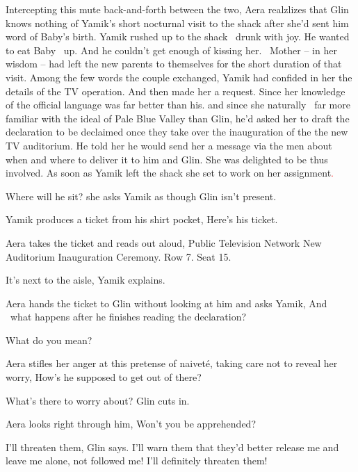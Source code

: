 \documentclass[letterpaper]{article}
\begin{document}
Intercepting this mute back-and-forth between the two, Aera realzlizes that Glin knows nothing of Yamik's short
nocturnal visit to the shack after she'd sent him word of Baby's birth. Yamik rushed up to the shack \ drunk with joy.
He wanted to eat Baby \ up. And he\textcolor{red}{ }couldn't get enough of kissing her. ~Mother -- in her wisdom -- had
left the new parents to themselves for the short duration of that visit. Among the few words the couple exchanged,
Yamik had confided in her the details of the TV operation. And then made her a request. Since her knowledge of the
official language was far better than his. and since she naturally \ far more familiar with the ideal of Pale Blue
Valley than Glin, he'd asked her to draft the declaration to be declaimed once they take over the inauguration of the
the new TV auditorium. He told her he would send her a message via the men about when and where to deliver it to him
and Glin. She was delighted to be thus involved. As soon as Yamik left the shack she set to work on her
assignment\textcolor{red}{. }

{\textquotedbl}Where will he sit?{\textquotedbl} she asks Yamik as though Glin isn't present. 

Yamik produces a ticket from his shirt pocket, {\textquotedbl}Here's his ticket.{\textquotedbl} 

Aera takes the ticket and reads out aloud, {\textquotedbl}Public Television Network New Auditorium Inauguration
Ceremony. Row 7. Seat 15.{\textquotedbl} 

{\textquotedbl}It's next to the aisle,{\textquotedbl} Yamik explains. 

Aera hands the ticket to Glin without looking at him and asks Yamik, {\textquotedbl}And \ what happens after he finishes
reading the declaration?{\textquotedbl} 

{\textquotedbl}What do you mean?{\textquotedbl} 

Aera stifles her anger at this pretense of naivet\'e, taking care not to reveal her worry, {\textquotedbl}How's he
supposed to get out of there?{\textquotedbl} 

{\textquotedbl}What's there to worry about?{\textquotedbl} Glin cuts in\textcolor[rgb]{0.0,0.4392157,0.7529412}{.}

Aera looks right through him, {\textquotedbl}Won't you be apprehended?{\textquotedbl} 

{\textquotedbl}I'll threaten them,{\textquotedbl} Glin says. {\textquotedbl}I'll warn them that they'd better release me
and leave me alone, not followed me! I'll definitely threaten them!{\textquotedbl}
\end{document}
